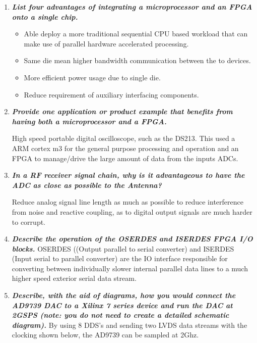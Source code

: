 \documentclass[11pt]{article}
\begin{document}
\begin{preview}
\begin{enumerate}
    
    \item \textit{\textbf{List four advantages of integrating a microprocessor and an FPGA onto a single chip.}}
    
    \begin{itemize}
        \item Able deploy a more traditional sequential CPU based workload that can make use of parallel hardware accelerated processing.
        \item Same die mean higher bandwidth communication between the to devices.
        \item More efficient power usage due to single die.
        \item Reduce requirement of auxiliary interfacing components.
    \end{itemize}
    
    \item \textit{\textbf{Provide one application or product example that benefits from having both a microprocessor and a FPGA.}}
    
    High speed portable digital oscilloscope, such as the DS213. This used a ARM cortex m3 for the general purpose processing and operation and an FPGA to manage/drive the large amount of data from the inputs ADCs.

    \item \textit{\textbf{In a RF receiver signal chain, why is it advantageous to have the ADC as close as possible to the Antenna?}}
    
    Reduce analog signal line length as much as possible to reduce interference from noise and reactive coupling, as to digital output signals are much harder to corrupt.

    \item \textit{\textbf{Describe the operation of the OSERDES and ISERDES FPGA I/O blocks.}}
    OSERDES ((Output parallel to serial converter) and ISERDES (Input serial to parallel converter) are the IO interface responsible for converting between individually slower internal parallel data lines to a much higher speed exterior serial data stream. 
    

    \item \textit{\textbf{Describe, with the aid of diagrams, how you would connect the AD9739 DAC to a Xilinx 7 series device and run the DAC at 2GSPS (note: you do not need to create a detailed schematic diagram).}}
    By using 8 DDS's and sending two LVDS data streams with the clocking shown below, the AD9739 can be sampled at 2Ghz. 



\end{enumerate}
\end{preview}
\end{document}
